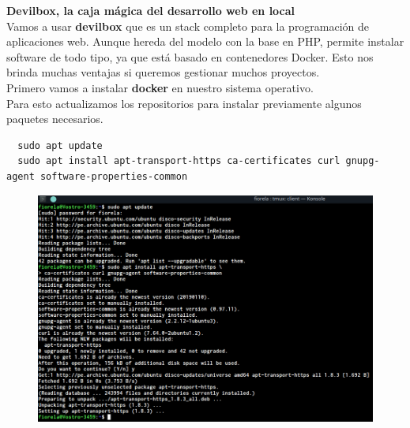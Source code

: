 \documentclass{article}
\begin{document}
%
%
%
%
%

\textbf{Devilbox, la caja mágica del desarrollo web en local}\\ Vamos a usar
\textbf{devilbox} que es un stack completo para la programación de aplicaciones
web. Aunque hereda del modelo con la base en PHP, permite instalar software de
todo tipo, ya que está basado en contenedores Docker. Esto nos brinda muchas
ventajas si queremos gestionar muchos proyectos.\\

Primero vamos a instalar \textbf{docker} en nuestro sistema operativo.\\
Para esto actualizamos los repositorios para instalar previamente algunos
paquetes necesarios.

\begin{verbatim}
  sudo apt update
  sudo apt install apt-transport-https ca-certificates curl gnupg-agent software-properties-common
\end{verbatim}

\begin{figure}[h!]
  \centering
  \includegraphics[scale=0.75]{./Pictures/Devilbox/001_docker.png}
\end{figure}
\end{document}

